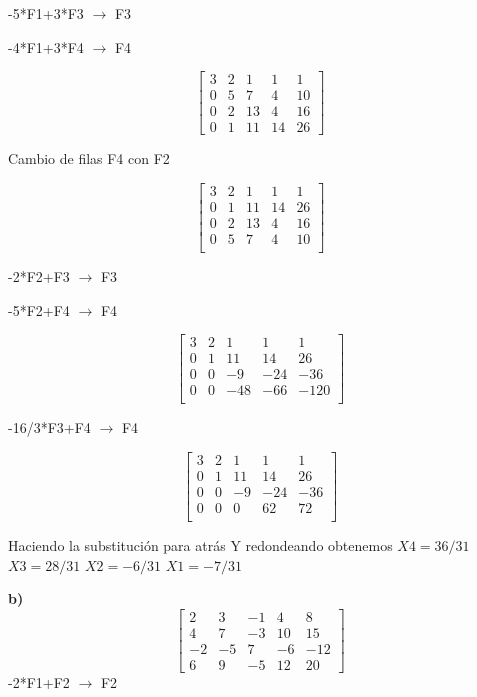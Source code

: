 \documentclass[12pt]{article}
\begin{document}
-5*F1+3*F3 $\longrightarrow $ F3

-4*F1+3*F4 $\longrightarrow $ F4

\[
\begin{bmatrix}
3 & 2 & 1 & 1 & 1\\
0 & 5 & 7 & 4 & 10 \\
0 & 2 & 13 & 4 & 16 \\
0 & 1 & 11 & 14 & 26
\end{bmatrix}
\]

Cambio de filas F4 con F2

\[
\begin{bmatrix}
3 & 2 & 1 & 1 & 1\\
0 & 1 & 11 & 14 & 26\\
0 & 2 & 13 & 4 & 16 \\
0 & 5 & 7 & 4 & 10 \\
\end{bmatrix}
\]

-2*F2+F3 $\longrightarrow $ F3

-5*F2+F4 $\longrightarrow $ F4

\[
\begin{bmatrix}
3 & 2 & 1 & 1 & 1\\
0 & 1 & 11 & 14 & 26\\
0 & 0 & -9 & -24 & -36 \\
0 & 0 & -48 & -66 & -120 \\
\end{bmatrix}
\]

-16/3*F3+F4 $\longrightarrow $ F4

\[
\begin{bmatrix}
3 & 2 & 1 & 1 & 1\\
0 & 1 & 11 & 14 & 26\\
0 & 0 & -9 & -24 & -36 \\
0 & 0 & 0 & 62 & 72 \\
\end{bmatrix}
\]

Haciendo la substitución para atrás Y redondeando obtenemos
$X4 = 36/31$ $X3 = 28/31$    $X2 = -6/31$  $X1 = -7/31$ 




\textbf{b)}
\[
\begin{bmatrix}
2 & 3 & -1 & 4 & 8\\
4 & 7 & -3 & 10 & 15 \\
-2 & -5 & 7 & -6 & -12 \\
6 & 9 & -5 & 12 & 20
\end{bmatrix}
\]
-2*F1+F2 $\longrightarrow $ F2
\end{document}

